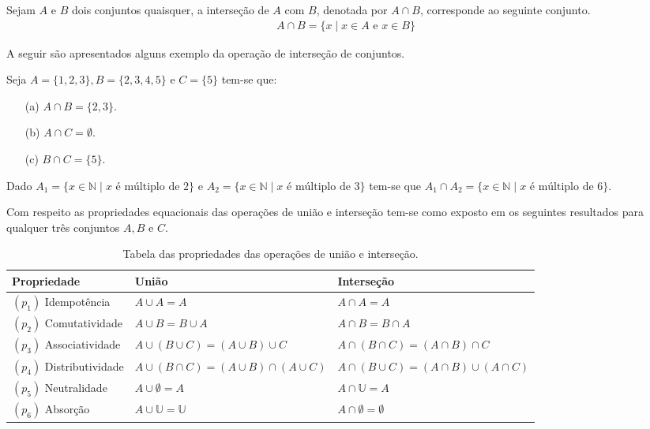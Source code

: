 \begin{definicao}\label{def:IntersecaoConjuntos}
	Sejam $A$ e $B$ dois conjuntos quaisquer, a interseção de $A$ com $B$, denotada por $A \cap B$, corresponde ao seguinte conjunto.
  \begin{eqnarray*}
    A \cap B = \{x \mid x \in A \mbox{ e } x \in B\}
  \end{eqnarray*}
\end{definicao}

A seguir são apresentados alguns exemplo da operação de interseção de conjuntos.

\begin{exemplo}\label{exe:IntersecaoConjuntos1}
  Seja $A = \{1, 2, 3\}, B = \{2, 3, 4, 5\}$ e $C = \{5\}$ tem-se que:
	\begin{itemize}
		\item[(a)] $A \cap B = \{2, 3\}$.
		\item[(b)] $A \cap C = \emptyset$.
		\item[(c)] $B \cap C = \{5\}$.
	\end{itemize}
\end{exemplo}

\begin{exemplo}\label{exe:IntersecaoConjuntos2}
  Dado $A_1 = \{x \in \mathbb{N} \mid x \mbox{ é múltiplo de } 2\}$ e $A_2 = \{x \in \mathbb{N} \mid x \mbox{ é múltiplo de } 3\}$ tem-se que $A_1 \cap A_2 = \{x \in \mathbb{N} \mid x \mbox{ é múltiplo de } 6\}$.
\end{exemplo}

Com respeito as propriedades equacionais das operações de união e interseção tem-se como exposto em \cite{lipschutz2013-MD} os seguintes resultados para qualquer três conjuntos $A, B$ e $C$.

\begin{table}[h]
	\centering
	\scriptsize
	\begin{tabular}{lll}
		\hline
		Propriedade & União & Interseção\\
		\hline
    $(p_1)$ Idempotência &  $A \cup A = A$ & $A \cap A = A$\\
		$(p_2)$ Comutatividade & $A \cup B = B \cup A$ & $A \cap B = B \cap A$\\
		$(p_3)$ Associatividade & $A \cup (B \cup C) = (A \cup B) \cup C$ & $A \cap (B \cap C) = (A \cap B) \cap C$\\
		$(p_4)$ Distributividade & $A \cup (B \cap C) = (A \cup B) \cap (A \cup C)$ & $A \cap (B \cup C) = (A \cap B) \cup (A \cap C)$\\
		$(p_5)$ Neutralidade &  $A \cup \emptyset = A$ & $A \cap \mathbb{U} = A$\\
		$(p_6)$ Absorção & $A \cup \mathbb{U} = \mathbb{U}$ & $A \cap \emptyset = \emptyset$\\
		\hline
	\end{tabular}
	\caption{Tabela das propriedades das operações de união e interseção.}
	\label{tab:PropriedadesUniaoIntersecao}
\end{table}

